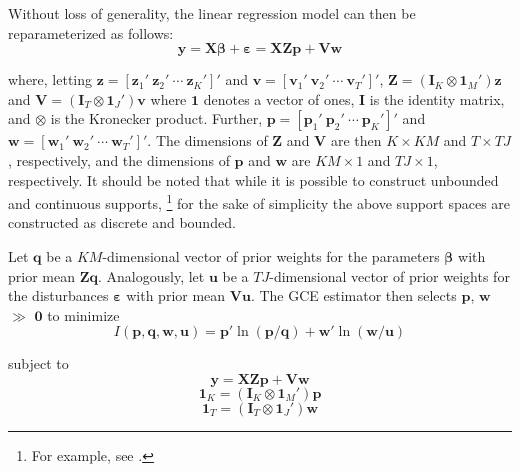 \documentclass[english]{article}
\begin{document}
Without loss of generality, the linear regression model can then be 
reparameterized as follows:
\begin{equation}
\mathbf{y} = \mathbf{X\beta} + \mathbf{\varepsilon} = 
\mathbf{X Z p} + \mathbf{V w}
\end{equation}

\noindent
where, letting $\mathbf{z}=[\mathbf{z}_1' ~ \mathbf{z}_2' ~ \cdots ~ 
\mathbf{z}_K' ]'$ and $\mathbf{v}=[\mathbf{v}_1' ~ \mathbf{v}_2' ~ 
\cdots ~ \mathbf{v}_T' ]'$, 
$\mathbf{Z}= (\mathbf{I}_K \otimes \mathbf{1}_M')\mathbf{z}$ and
$\mathbf{V}= (\mathbf{I}_T \otimes \mathbf{1}_J')\mathbf{v}$
where $\mathbf{1}$ denotes a vector of ones, $\mathbf{I}$ is the 
identity matrix, and $\otimes$ is the Kronecker product.
Further, $\mathbf{p} = [\mathbf{p}_1' ~ \mathbf{p}_2' ~ \cdots ~ 
\mathbf{p}_K' ]'$ and $\mathbf{w} = [\mathbf{w}_1' ~ \mathbf{w}_2' 
~ \cdots ~ \mathbf{w}_T' ]'$.
The dimensions of $\mathbf{Z}$ and $\mathbf{V}$ are then 
$K \times KM$ and $T \times TJ$, respectively, and the dimensions of 
$\mathbf{p}$ and $\mathbf{w}$ are $KM \times 1$ and $TJ \times 1$, 
respectively.
It should be noted that while it is possible to construct unbounded and 
continuous supports,%
\footnote{For example, see \citet{golan2002}.}
for the sake of simplicity the above support spaces are constructed as 
discrete and bounded. 

Let $\mathbf{q}$ be a $KM$-dimensional vector of prior weights for the 
parameters $\mathbf{\beta}$ with prior mean $\mathbf{Zq}$.
Analogously, let $\mathbf{u}$ be a $TJ$-dimensional vector of prior weights 
for the disturbances $\mathbf{\varepsilon}$ with prior mean $\mathbf{Vu}$.
The GCE estimator then selects $\mathbf{p}$, $\mathbf{w}$ $\gg$ 
$\mathbf{0}$ to minimize 
\begin{equation}
I({\mathbf{p}, \mathbf{q}, \mathbf{w}, \mathbf{u}}) = 
\mathbf{p}' \ln (\mathbf{p}/\mathbf{q}) + 
\mathbf{w}' \ln (\mathbf{w}/\mathbf{u})
\label{eq: ce}
\end{equation}

\noindent
subject to
\begin{equation}
\mathbf{y} = \mathbf{X Z p} 
+ \mathbf{V w}
\label{eq: glm}
\end{equation}
\begin{equation}
\mathbf{1}_K = (\mathbf{I}_K \otimes \mathbf{1}_M')\mathbf{p}
\label{eq: pp1}
\end{equation}
\begin{equation}
\mathbf{1}_T = (\mathbf{I}_T \otimes \mathbf{1}_J')\mathbf{w}
\label{eq: pp2}
\end{equation}
\end{document}
